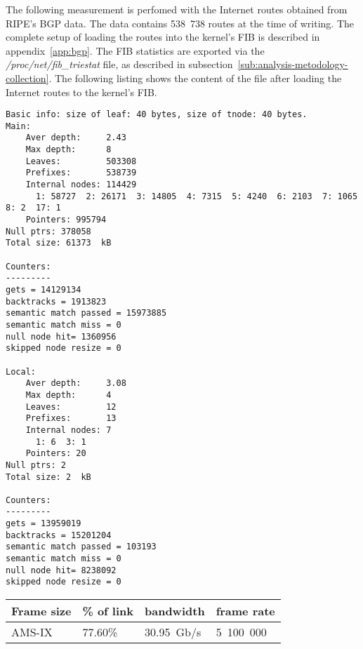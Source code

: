 
The following measurement is perfomed with the Internet routes obtained from RIPE's BGP data.
The data contains 538~738 routes at the time of writing.
The complete setup of loading the routes into the kernel's FIB is described in appendix~\ref{app:bgp}.
The FIB statistics are exported via the {\it{/proc/net/fib\_triestat}} file, as described in
subsection~\ref{sub:analysis-metodology-collection}.
The following listing shows the content of the file after loading the Internet routes to the kernel's FIB.
\begin{lstlisting}
Basic info: size of leaf: 40 bytes, size of tnode: 40 bytes.
Main:
	Aver depth:     2.43
	Max depth:      8
	Leaves:         503308
	Prefixes:       538739
	Internal nodes: 114429
	  1: 58727  2: 26171  3: 14805  4: 7315  5: 4240  6: 2103  7: 1065  8: 2  17: 1
	Pointers: 995794
Null ptrs: 378058
Total size: 61373  kB

Counters:
---------
gets = 14129134
backtracks = 1913823
semantic match passed = 15973885
semantic match miss = 0
null node hit= 1360956
skipped node resize = 0

Local:
	Aver depth:     3.08
	Max depth:      4
	Leaves:         12
	Prefixes:       13
	Internal nodes: 7
	  1: 6  3: 1
	Pointers: 20
Null ptrs: 2
Total size: 2  kB

Counters:
---------
gets = 13959019
backtracks = 15201204
semantic match passed = 103193
semantic match miss = 0
null node hit= 8238092
skipped node resize = 0
\end{lstlisting}

\begin{tabular}{ | l | l | l | l | }
\hline
Frame size & \% of link & bandwidth & frame rate \\
\hline
AMS-IX & 77.60\% &  30.95~Gb/s & 5~100~000 \\
\hline
\end{tabular}

